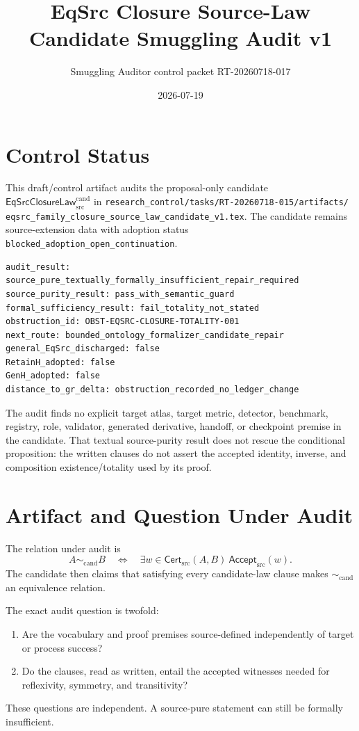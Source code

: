 \documentclass[11pt]{article}
\title{EqSrc Closure Source-Law Candidate Smuggling Audit v1}
\author{Smuggling Auditor control packet RT-20260718-017}
\date{2026-07-19}
\newcommand{\Cert}{\mathsf{Cert}_{\mathrm{src}}}
\newcommand{\Accept}{\mathsf{Accept}_{\mathrm{src}}}
\newcommand{\Law}{\mathsf{EqSrcClosureLaw}^{\mathrm{cand}}_{\mathrm{src}}}
\begin{document}
\maketitle

\section{Control Status}

This draft/control artifact audits the proposal-only candidate
\(\Law\) in
\texttt{research\_control/tasks/RT-20260718-015/artifacts/
eqsrc\_family\_closure\_source\_law\_candidate\_v1.tex}.
The candidate remains source-extension data with adoption status
\texttt{blocked\_adoption\_open\_continuation}.

\begin{verbatim}
audit_result: source_pure_textually_formally_insufficient_repair_required
source_purity_result: pass_with_semantic_guard
formal_sufficiency_result: fail_totality_not_stated
obstruction_id: OBST-EQSRC-CLOSURE-TOTALITY-001
next_route: bounded_ontology_formalizer_candidate_repair
general_EqSrc_discharged: false
RetainH_adopted: false
GenH_adopted: false
distance_to_gr_delta: obstruction_recorded_no_ledger_change
\end{verbatim}

The audit finds no explicit target atlas, target metric, detector, benchmark,
registry, role, validator, generated derivative, handoff, or checkpoint
premise in the candidate. That textual source-purity result does not rescue the
conditional proposition: the written clauses do not assert the accepted
identity, inverse, and composition existence/totality used by its proof.

\section{Artifact and Question Under Audit}

The relation under audit is
\[
 A\sim_{\mathrm{cand}}B
 \quad\Longleftrightarrow\quad
 \exists w\in\Cert(A,B)\ \Accept(w).
\]
The candidate then claims that satisfying every candidate-law clause makes
\(\sim_{\mathrm{cand}}\) an equivalence relation.

The exact audit question is twofold:
\begin{enumerate}[leftmargin=*]
  \item Are the vocabulary and proof premises source-defined independently of
  target or process success?
  \item Do the clauses, read as written, entail the accepted witnesses needed
  for reflexivity, symmetry, and transitivity?
\end{enumerate}
These questions are independent. A source-pure statement can still be
formally insufficient.
\end{document}

